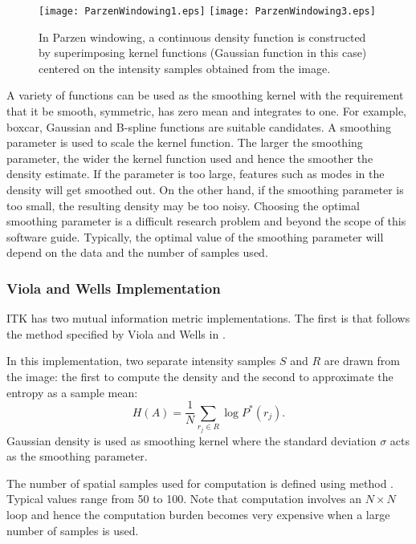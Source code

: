 \begin{figure}
\center
\texttt{[image: ParzenWindowing1.eps]}
\texttt{[image: ParzenWindowing3.eps]}
\caption[Parzen windowing in Mutual Information]{ In Parzen windowing, a
continuous density function is constructed by superimposing kernel functions
(Gaussian function in this case) centered on the intensity samples obtained
from the image. }
\label{fig:ParzenWindowing}
\end{figure}

A variety of functions can be used as the smoothing kernel with the
requirement that it be smooth, symmetric, has zero mean and
integrates to one. For example, boxcar, Gaussian and B-spline functions
are suitable candidates.
A smoothing parameter is used to scale the kernel function.
The larger the smoothing parameter, the wider the kernel function
used and hence the smoother the density estimate. If the parameter is
too large, features such as modes in the density will get smoothed out.
On the other hand, if the smoothing parameter is too small, the
resulting density may be too noisy. Choosing the optimal smoothing parameter 
is a difficult research 
problem and beyond the scope of this software guide.
Typically, the optimal value of the smoothing parameter will 
depend on the data and the number of samples used.

\subsubsection{Viola and Wells Implementation}
ITK has two mutual information metric implementations. The first is 
 that follows the method specified
by Viola and Wells in \cite{Viola1997}.


In this implementation, two separate intensity samples $S$ and $R$ are drawn
from the image: the first to compute the density and the second to approximate
the entropy as a sample mean:
\begin{equation}
H(A) = \frac{1}{N} \sum_{r_j \in R} \log P^{*}(r_j).
\end{equation}
Gaussian density is used as smoothing kernel where the standard deviation
$\sigma$ acts as the smoothing parameter.


The number of spatial samples used for computation is defined using
method . Typical values range from 50 to 100.
Note that computation involves an $N \times N$ loop and hence the computation
burden becomes very expensive when a large number of samples is used.

